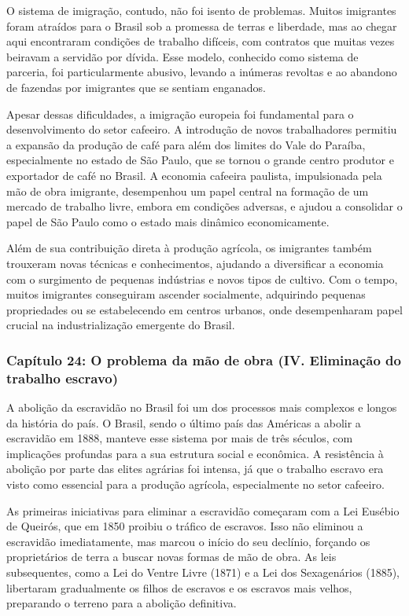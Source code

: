 \documentclass[a4paper,12pt]{article}[abntex2]
\begin{document}
O sistema de imigração, contudo, não foi isento de problemas. Muitos imigrantes foram atraídos para o Brasil sob a promessa de terras e liberdade, mas ao chegar aqui encontraram condições de trabalho difíceis, com contratos que muitas vezes beiravam a servidão por dívida. Esse modelo, conhecido como sistema de parceria, foi particularmente abusivo, levando a inúmeras revoltas e ao abandono de fazendas por imigrantes que se sentiam enganados.

Apesar dessas dificuldades, a imigração europeia foi fundamental para o desenvolvimento do setor cafeeiro. A introdução de novos trabalhadores permitiu a expansão da produção de café para além dos limites do Vale do Paraíba, especialmente no estado de São Paulo, que se tornou o grande centro produtor e exportador de café no Brasil. A economia cafeeira paulista, impulsionada pela mão de obra imigrante, desempenhou um papel central na formação de um mercado de trabalho livre, embora em condições adversas, e ajudou a consolidar o papel de São Paulo como o estado mais dinâmico economicamente.

Além de sua contribuição direta à produção agrícola, os imigrantes também trouxeram novas técnicas e conhecimentos, ajudando a diversificar a economia com o surgimento de pequenas indústrias e novos tipos de cultivo. Com o tempo, muitos imigrantes conseguiram ascender socialmente, adquirindo pequenas propriedades ou se estabelecendo em centros urbanos, onde desempenharam papel crucial na industrialização emergente do Brasil.

\subsubsection{\textbf{Capítulo 24: O problema da mão de obra (IV. Eliminação do trabalho escravo)}}

A abolição da escravidão no Brasil foi um dos processos mais complexos e longos da história do país. O Brasil, sendo o último país das Américas a abolir a escravidão em 1888, manteve esse sistema por mais de três séculos, com implicações profundas para a sua estrutura social e econômica. A resistência à abolição por parte das elites agrárias foi intensa, já que o trabalho escravo era visto como essencial para a produção agrícola, especialmente no setor cafeeiro.

As primeiras iniciativas para eliminar a escravidão começaram com a Lei Eusébio de Queirós, que em 1850 proibiu o tráfico de escravos. Isso não eliminou a escravidão imediatamente, mas marcou o início do seu declínio, forçando os proprietários de terra a buscar novas formas de mão de obra. As leis subsequentes, como a Lei do Ventre Livre (1871) e a Lei dos Sexagenários (1885), libertaram gradualmente os filhos de escravos e os escravos mais velhos, preparando o terreno para a abolição definitiva.
\end{document}
